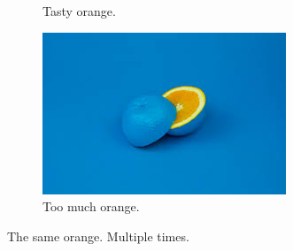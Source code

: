 \documentclass{article}
\begin{document}
\begin{figure}[h!]
\begin{subfigure}[b]{0.2\linewidth}
		\caption{Tasty orange.}
		\end{subfigure}
	\begin{subfigure}[b]{0.5\linewidth}
		\includegraphics[width=\linewidth]{orange.jpg}
		\caption{Too much orange.}
	\end{subfigure}
		
		\caption{The same orange. Multiple times.}
		\label{fig:orange}
	\end{figure}
\end{document}
